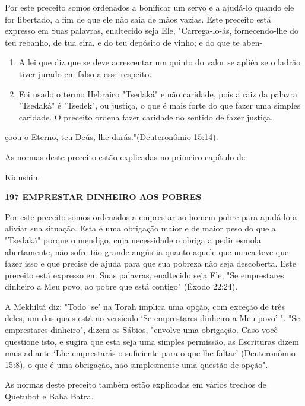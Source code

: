 \begin{itemize}
\begin{enumrate}
\begin{itemize}
\begin{itemize}
\begin{itemize}
Por este preceito somos ordenados a bonificar um servo e a ajudá-lo
quando ele for libertado, a fim de que ele não saia de mãos vazias. Este
preceito está expresso em Suas palavras, enaltecido seja Ele,
"Carrega-lo-ás, fornecendo-lhe do teu rebanho, de tua eira, e do teu
depósito de vinho; e do que te aben-


\begin{enumerate}
\def\labelenumi{\arabic{enumi}.}
\setcounter{enumi}{198}
\item
 
 A lei que diz que se deve acrescentar um quinto do valor se apliéa se
 o ladrão tiver jurado em falso a esse respeito.
 
\item
 
 Foi usado o termo Hebraico "Tsedaká" e não caridade, pois a raiz da
 palavra "Tsedaká" é "Tsedek", ou justiça, o que é mais forte do que
 fazer uma simples caridade. O preceito ordena fazer caridade no
 sentido de fazer justiça.
 
\end{enumerate}

çoou o Eterno, teu Deús, lhe darás."(Deuteronômio 15:14).


As normas deste preceito estão explicadas no primeiro capítulo de


Kidushin.


\textbf{197 EMPRESTAR DINHEIRO AOS POBRES}


Por este preceito somos ordenados a emprestar ao homem pobre para
ajudá-lo a aliviar sua situação. Esta é uma obrigação maior e de maior
peso do que a "Tsedaká" porque o mendigo, cuja necessidade o obriga a
pedir es­mola abertamente, não sofre tão grande angústia quanto aquele
que nunca teve que fazer isso e que precise de ajuda para que sua
pobreza não seja descoberta. Este preceito está expresso em Suas
palavras, enaltecido seja Ele, "Se empresta­res dinheiro a Meu povo, ao
pobre que está contigo" (Êxodo 22:24).

A Mekhiltá diz: "Todo `se' na Torah implica uma opção, com exce­ção de
três deles, um dos quais está no versículo `Se emprestares dinheiro a
Meu povo' ". "Se emprestares dinheiro", dizem os Sábios, "envolve uma
obri­gação. Caso você questione isto, e sugira que esta seja uma simples
permissão, as Escrituras dizem mais adiante `Lhe emprestarás o
suficiente para o que lhe faltar' (Deuteronômio 15:8), o que é uma
obrigação, não simplesmente uma ques­tão de opção".

As normas deste preceito também estão explicadas em vários trechos de
Quetubot e Baba Batra.


\end{itemize}
\end{itemize}
\end{itemize}
\end{enumrate}
\end{itemize}
